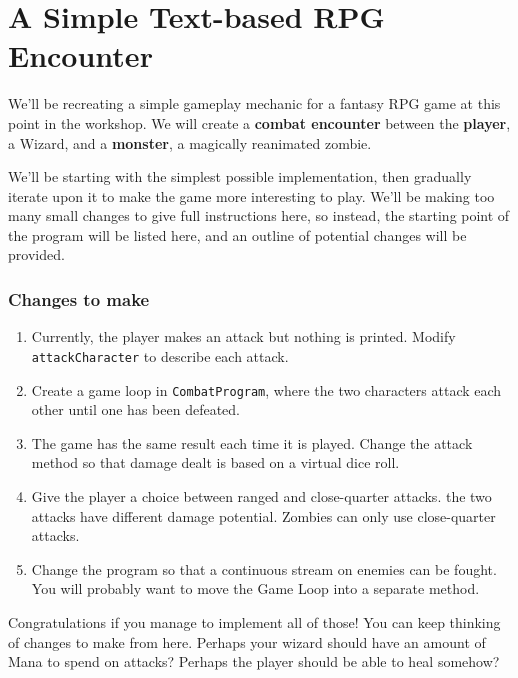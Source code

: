 \section{A Simple Text-based RPG Encounter}

	We'll be recreating a simple gameplay mechanic for a fantasy RPG game at this point in the workshop. We will create a \textbf{combat encounter} between the \textbf{player}, a Wizard, and a \textbf{monster}, a magically reanimated zombie.
	
	We'll be starting with the simplest possible implementation, then gradually iterate upon it to make the game more interesting to play. We'll be making too many small changes to give full instructions here, so instead, the starting point of the program will be listed here, and an outline of potential changes will be provided.
	
	
	
	
	\subsubsection{Changes to make}
	
		\begin{enumerate}
			\item Currently, the player makes an attack but nothing is printed. Modify \texttt{attackCharacter} to describe each attack.
			\item Create a game loop in \texttt{CombatProgram}, where the two characters attack each other until one has been defeated.
			\item The game has the same result each time it is played. Change the attack method so that damage dealt is based on a virtual dice roll.
			\item Give the player a choice between ranged and close-quarter attacks. the two attacks have different damage potential. Zombies can only use close-quarter attacks.
			\item Change the program so that a continuous stream on enemies can be fought. You will probably want to move the Game Loop into a separate method.
		\end{enumerate}
	
	Congratulations if you manage to implement all of those! You can keep thinking of changes to make from here. Perhaps your wizard should have an amount of Mana to spend on attacks? Perhaps the player should be able to heal somehow?

